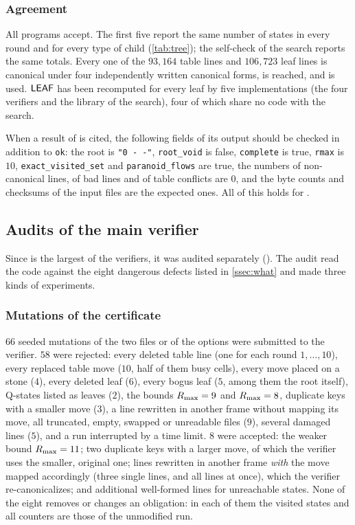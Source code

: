 \subsubsection*{Agreement}
All programs accept. The first five report the same number of states in every round and for every
type of child (\cref{tab:tree}); the self-check of the search reports the same totals. Every one of the
$93{,}164$ table lines and $106{,}723$ leaf lines is canonical under four independently written canonical
forms, is reached, and is used. $\mathsf{LEAF}$ has been recomputed for every leaf by five implementations (the
four verifiers and the library of the search), four of which share no code with the search.

When a result of  is cited, the following fields of its output should be checked in addition
to \texttt{ok}: the root is \texttt{"0 - -"}, \texttt{root\_void} is false, \texttt{complete} is true,
\texttt{rmax} is $10$, \texttt{exact\_visited\_set} and \texttt{paranoid\_flows} are true, the numbers of
non-canonical lines, of bad lines and of table conflicts are $0$, and the byte counts and checksums of the
input files are the expected ones. All of this holds for .

\subsection{Audits of the main verifier}\label{ssec:audits}

Since  is the largest of the verifiers, it was audited separately
(). The audit read the code against the eight dangerous defects listed in
\cref{ssec:what} and made three kinds of experiments.

\subsubsection*{Mutations of the certificate}
$66$ seeded mutations of the two files or of the options were submitted to the verifier. $58$ were
rejected: every deleted table line (one for each round $1,\dots,10$), every replaced table move ($10$, half
of them busy cells), every move placed on a stone ($4$), every deleted leaf ($6$), every bogus leaf ($5$,
among them the root itself), Q-states listed as leaves ($2$), the bounds $R_{\max}=9$ and $R_{\max}=8$,
duplicate keys with a smaller move ($3$), a line rewritten in another frame without mapping its move, all
truncated, empty, swapped or unreadable files ($9$), several damaged lines ($5$), and a run interrupted
by a time limit. $8$ were accepted: the weaker bound $R_{\max}=11$; two duplicate keys with a larger move, of which the verifier uses the smaller,
original one; lines rewritten in another frame \emph{with} the move mapped accordingly (three single
lines, and all lines at once), which the verifier re-canonicalizes; and additional well-formed lines for
unreachable states. None of the eight removes or changes an obligation: in each of them the visited
states and all counters are those of the unmodified run.

